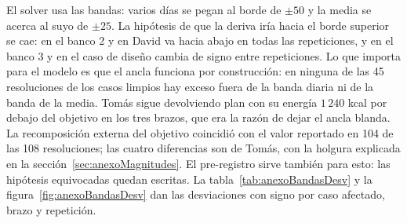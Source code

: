 El solver usa las bandas: varios días se pegan al borde de $\pm 50$ y la media se acerca al suyo de $\pm 25$. La hipótesis de que la deriva iría hacia el borde superior se cae: en el banco 2 y en David va hacia abajo en todas las repeticiones, y en el banco 3 y en el caso de diseño cambia de signo entre repeticiones. Lo que importa para el modelo es que el ancla funciona por construcción: en ninguna de las 45 resoluciones de los casos limpios hay exceso fuera de la banda diaria ni de la banda de la media. Tomás sigue devolviendo plan con su energía $1\,240$ kcal por debajo del objetivo en los tres brazos, que era la razón de dejar el ancla blanda. La recomposición externa del objetivo coincidió con el valor reportado en 104 de las 108 resoluciones; las cuatro diferencias son de Tomás, con la holgura explicada en la sección~\ref{sec:anexoMagnitudes}. El pre-registro sirve también para esto: las hipótesis equivocadas quedan escritas. La tabla~\ref{tab:anexoBandasDesv} y la figura~\ref{fig:anexoBandasDesv} dan las desviaciones con signo por caso afectado, brazo y repetición.

